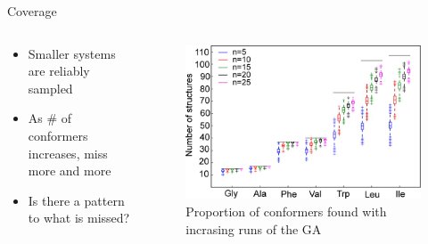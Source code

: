 \documentclass[10pt]{beamer}
\begin{document}
{%
\begin{frame}{Coverage}
	\begin{columns}[c] %
		\begin{column}{.4\textwidth}
			\begin{itemize}
				\item {Smaller systems are reliably sampled}
				\item {As \# of conformers increases, miss more and more}
				\item {Is there a pattern to what is missed?}
			\end{itemize}		
		\end{column}
		\hfill
		\begin{column}{0.6\textwidth}
			\begin{figure}
				\includegraphics[width=\linewidth]{images/Supady4.jpeg}
				\caption*{Proportion of conformers found with incrasing runs of the GA}
			\end{figure}
		\end{column}	
	\end{columns}
\end{frame}
}
\end{document}
